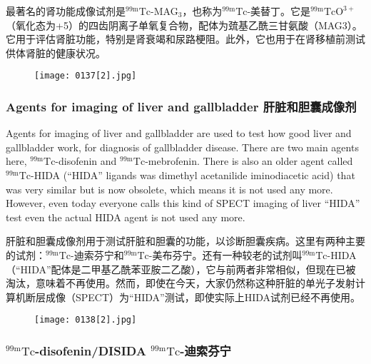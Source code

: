 \documentclass[dvipsnames, svgnames,a4paper,11pt]{article}
\begin{document}
最著名的肾功能成像试剂是${}^\mathrm{99m}\mathrm{Tc}$-MAG${}_3$，也称为${}^\mathrm{99m}\mathrm{Tc}$-美替丁。它是${}^\mathrm{99m}\mathrm{TcO^{3+}}$（氧化态为+5）的四齿阴离子单氧复合物，配体为巯基乙酰三甘氨酸（MAG3）。它用于评估肾脏功能，特别是肾衰竭和尿路梗阻。此外，它也用于在肾移植前测试供体肾脏的健康状况。

\begin{figure}[h]
	\centering
    \texttt{[image: 0137[2].jpg]}    
     \label{fig141}
\end{figure}

\subsubsection{Agents for imaging of liver and gallbladder 肝脏和胆囊成像剂}

Agents for imaging of liver and gallbladder are used to test how good liver and
gallbladder work, for diagnosis of gallbladder disease. There are two main agents
here, ${}^\mathrm{99m}\mathrm{Tc}$-disofenin and ${}^\mathrm{99m}\mathrm{Tc}$-mebrofenin. There is also an older agent called
${}^\mathrm{99m}\mathrm{Tc}$-HIDA (“HIDA” ligands was dimethyl acetanilide iminodiacetic acid) that was
very similar but is now obsolete, which means it is not used any more. However,
even today everyone calls this kind of SPECT imaging of liver “HIDA” test even the
actual HIDA agent is not used any more.


肝脏和胆囊成像剂用于测试肝脏和胆囊的功能，以诊断胆囊疾病。这里有两种主要的试剂：${}^\mathrm{99m}\mathrm{Tc}$-迪索芬宁和${}^\mathrm{99m}\mathrm{Tc}$-美布芬宁。还有一种较老的试剂叫${}^\mathrm{99m}\mathrm{Tc}$-HIDA（“HIDA”配体是二甲基乙酰苯亚胺二乙酸），它与前两者非常相似，但现在已被淘汰，意味着不再使用。然而，即使在今天，大家仍然称这种肝脏的单光子发射计算机断层成像（SPECT）为“HIDA”测试，即使实际上HIDA试剂已经不再使用。

\begin{figure}[h]
	\centering
    \texttt{[image: 0138[2].jpg]}    
     \label{fig143}
\end{figure}

\subsubsection{${}^\mathrm{99m}\mathrm{Tc}$-disofenin/DISIDA ${}^\mathrm{99m}\mathrm{Tc}$-迪索芬宁 }
\end{document}
